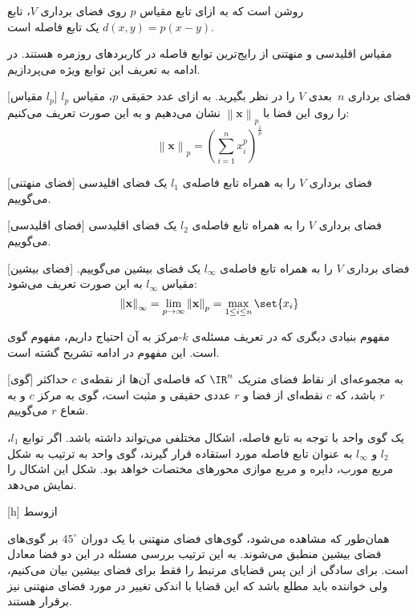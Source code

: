 روشن است که به ازای تابع مقیاس $p$ روی فضای برداری $V$، تابع $d(x,y) = p(x-y)$ یک تابع فاصله است.

مقیاس اقلیدسی و منهتنی از رایج‌ترین توابع فاصله در کاربردهای روزمره هستند. در ادامه به تعریف این توابع ویژه می‌پردازیم.

[مقیاس $l_p$]
فضای برداری $n$~بعدی $V$ را در نظر بگیرید. به ازای عدد حقیقی $p$، مقیاس $l_p$ را روی این فضا با $\left\| \mathbf{x} \right\|_p$ نشان می‌دهیم و به این صورت تعریف می‌کنیم:
\[
\left\| \mathbf{x} \right\|_p = \left( \sum_{i=1}^n x_i^p \right)^\frac{1}{p}
\]

[فضای منهتنی]
فضای برداری $V$ را به همراه تابع فاصله‌ی $l_1$ یک فضای اقلیدسی می‌گوییم.

[فضای اقلیدسی]
فضای برداری $V$ را به همراه تابع فاصله‌ی $l_2$ یک فضای اقلیدسی می‌گوییم.

[فضای بیشین]
فضای برداری $V$ را به همراه تابع فاصله‌ی $l_\infty$ یک فضای بیشین می‌گوییم. مقیاس $l_\infty$ به این صورت تعریف می‌شود:
\[
\left\| \mathbf{x} \right\|_\infty = \lim_{p \rightarrow \infty} \left\| \mathbf{x} \right\|_p = \max_{1 \leq i \leq n}\set{x_i}
\]

مفهوم بنیادی دیگری که در تعریف مسئله‌ی $k$-مرکز به آن احتیاج داریم، مفهوم گوی است. این مفهوم در ادامه تشریح گشته است.

[گوی]
به مجموعه‌ای از نقاط فضای متریک $\IR^n$ که فاصله‌ی آن‌ها از نقطه‌ی $c$ حداکثر $r$ باشد، که $c$ نقطه‌ای از فضا و $r$ عددی حقیقی و مثبت است، گوی به مرکز $c$ و به شعاع $r$ می‌گوییم.

یک گوی واحد با توجه به تابع فاصله، اشکال مختلفی می‌تواند داشته باشد. اگر توابع $l_1$، $l_2$ و $l_\infty$ به عنوان تابع فاصله مورد استقاده قرار گیرند، گوی واحد به ترتیب به شکل مربع مورب، دایره و مربع موازی محورهای مختصات خواهد بود. شکل  این اشکال را نمایش می‌دهد.

[h]
‌ازوسط

همان‌طور که مشاهده می‌شود، گوی‌های فضای منهتنی با یک دوران $45^\circ$ بر گوی‌های فضای بیشین منطبق می‌شوند. به این ترتیب بررسی مسئله در این دو فضا معادل است. برای سادگی از این پس قضایای مرتبط را فقط برای فضای بیشین بیان می‌کنیم، ولی خواننده باید مطلع باشد که این قضایا با اندکی تغییر در مورد فضای منهتنی نیز برقرار هستند.

